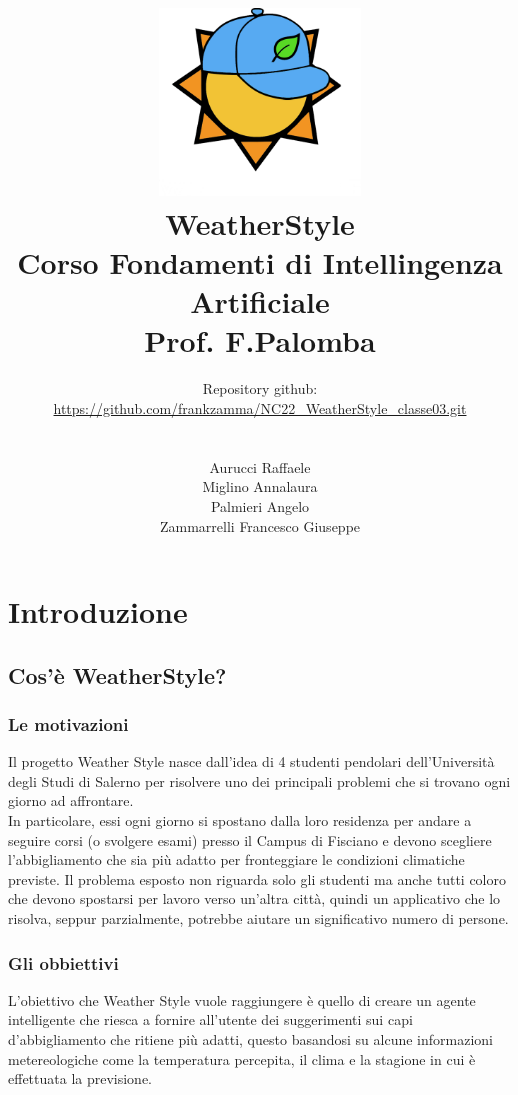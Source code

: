 \documentclass[a4paper, 11pt, oneside]{report}
\title{\includegraphics[width=0.4\textwidth]{logo}\\WeatherStyle\\Corso Fondamenti di Intellingenza Artificiale\\Prof. F.Palomba}
\author{Repository github:\\\url{https://github.com/frankzamma/NC22_WeatherStyle_classe03.git}\\\\
        \\Aurucci Raffaele\\Miglino Annalaura\\Palmieri Angelo\\Zammarrelli Francesco Giuseppe}
\date{}
\begin{document}
    \begin{titlepage}
        \maketitle
    \end{titlepage}

    \tableofcontents

    \part{Introduzione}
        \chapter{Cos'è WeatherStyle?}

            \section{Le motivazioni}
            Il progetto Weather Style nasce dall'idea di 4 studenti pendolari dell'Università degli Studi di Salerno per
            risolvere uno dei principali problemi che si trovano ogni giorno ad affrontare.\\
            In particolare, essi ogni giorno si spostano dalla loro residenza per andare
            a seguire corsi (o svolgere esami) presso il Campus di Fisciano e devono scegliere l'abbigliamento
            che sia più adatto per fronteggiare le condizioni climatiche previste.
            Il problema esposto non riguarda solo gli studenti ma anche tutti coloro che devono spostarsi per lavoro
            verso un'altra città, quindi un applicativo che lo risolva, seppur parzialmente,
            potrebbe aiutare un significativo numero di persone.

            \section{Gli obbiettivi}
            L'obiettivo che Weather Style vuole raggiungere è quello di creare un agente intelligente che riesca a fornire
            all'utente dei suggerimenti sui capi d'abbigliamento che ritiene più adatti, questo basandosi su alcune informazioni
            metereologiche come la temperatura percepita, il clima e la stagione in cui è effettuata la previsione.

            \bigskip
\end{document}
